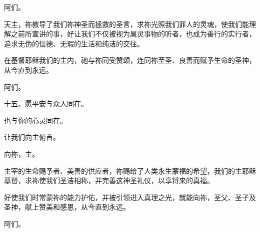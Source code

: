 阿们。\par

\par

天主，祢教导了我们祢神圣而拯救的圣言，求祢光照我们罪人的灵魂，使我们能理解之前所宣讲的事，好让我们不仅被视为属灵事物的听者，也成为善行的实行者，追求无伪的信德、无瑕的生活和纯洁的交往。\par

\par

在基督耶稣我们的主内，祂与祢同受赞颂，连同祢至圣、良善而赋予生命的圣神，从今直到永远。\par

\par

阿们。\par

\par

十五、愿平安与众人同在。\par

\par

也与你的心灵同在。\par

\par

让我们向主俯首。\par

\par

向祢，主。\par

\par

主宰的生命赐予者、美善的供应者，祢赐给了人类永生蒙福的希望，我们的主耶稣基督，求祢使我们圣洁相称，并完善这神圣礼仪，以享将来的真福。\par

\par

好使我们时常蒙祢的能力护佑，并被引领进入真理之光，就能向祢，圣父、圣子及圣神，献上赞美和感恩，从今直到永远。\par

\par

阿们。\par

\par

